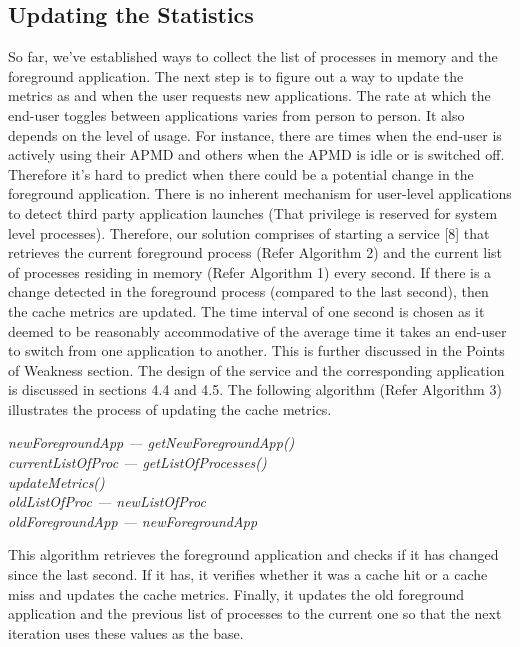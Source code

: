 \documentclass[12pt]{uthesis-v12}  %
\begin{document}
		\subsection{Updating the Statistics}
			 So far, we've established ways to collect the list of processes in memory and the foreground application. The next step is to figure out a way to update the metrics as and when the user requests new applications. The rate at which the end-user toggles between applications varies from person to person. It also depends on the level of usage. For instance, there are times when the end-user is actively using their APMD and others when the APMD is idle or is switched off. Therefore it's hard to predict when there could be a potential change in the foreground application. There is no inherent mechanism for user-level applications to detect third party application launches (That privilege is reserved for system level processes). Therefore, our solution comprises of starting a service [8] that retrieves the current foreground process (Refer Algorithm 2) and the current list of processes residing in memory (Refer Algorithm 1) every second. If there is a change detected in the foreground process (compared to the last second), then the cache metrics are updated. The time interval of one second is chosen as it deemed to be reasonably accommodative of the average time it takes an end-user to switch from one application to another. This is further discussed in the Points of Weakness section. The design of the service and the corresponding application is discussed in sections 4.4 and 4.5. The following algorithm (Refer Algorithm 3) illustrates the process of updating the cache metrics.\\     
			 
		 	\begin{algorithm}[H]
		 		\SetAlgoLined
		 				 		
		 		{	
		 			{\em newForegroundApp --- getNewForegroundApp()}\\
		 			{\em currentListOfProc --- getListOfProcesses()}\\	 			
		 			{\em updateMetrics()}\\
		 			{\em oldListOfProc --- newListOfProc}\\
		 			{\em oldForegroundApp --- newForegroundApp}		 			
		 		}
		 		
		 		\caption[Algorithm to update cache metrics]{This algorithm retrieves the foreground application and checks if it has changed since the last second. If it has, it verifies whether it was a cache hit or a cache miss and updates the cache metrics. Finally, it updates the old foreground application and the previous list of processes to the current one so that the next iteration uses these values as the base.}
		 	\end{algorithm}
\end{document}
